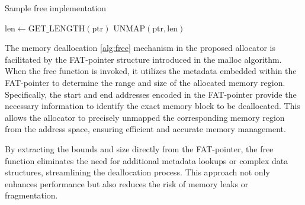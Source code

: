 \documentclass[11pt]{article}
\begin{document}
\begin{algorithm}
\caption{Sample free implementation}
\label{alg:free}
\begin{algorithmic}[1]
    \State $\text{len} \gets \text{GET\_LENGTH}(\text{ptr})$ 
    \State $\text{UNMAP}(\text{ptr}, \text{len})$ 
\EndFunction
\end{algorithmic}
\end{algorithm}

The memory deallocation \ref{alg:free} mechanism in the proposed allocator is facilitated by the FAT-pointer structure 
introduced in the malloc algorithm. When the free function is invoked, it utilizes the metadata 
embedded within the FAT-pointer to determine the range and size of the allocated memory region. 
Specifically, the start and end addresses encoded in the FAT-pointer provide the necessary information 
to identify the exact memory block to be deallocated. This allows the allocator to precisely unmapped 
the corresponding memory region from the address space, ensuring efficient and accurate memory management.

By extracting the bounds and size directly from the FAT-pointer, the free function eliminates the need 
for additional metadata lookups or complex data structures, streamlining the deallocation process. 
This approach not only enhances performance but also reduces the risk of memory leaks or fragmentation.



\end{document}
